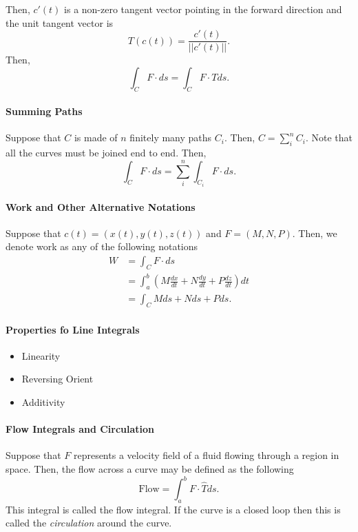 \documentclass[12pt, letterpaper]{article}
\begin{document}
    Then, \(c'(t)\) is a non-zero tangent vector pointing in the forward direction and the unit tangent vector is 
    \[T(c(t)) = \frac{c'(t)}{||c'(t)||}.\]
    Then,
    \[
        \int_C F\cdot ds = \int_C F \cdot T ds.
    \]
    
    \paragraph{Summing Paths}
    Suppose that \(C\) is made of \(n\) finitely many paths \(C_i\).
    Then, \(C = \sum_{i}^n C_i\).
    Note that all the curves must be joined end to end.
    Then,
    \[\int_C F \cdot ds = \sum_{i}^n \int_{C_i} F \cdot ds.\]

    \paragraph{Work and Other Alternative Notations}
    Suppose that \(c(t) = (x(t), y(t), z(t))\) and
    \(F = (M, N, P)\).
    Then, we denote work as any of the following notations
    \begin{align*}
        W
        &= \int_C F\cdot ds \\
        &= \int_a^b \left(
            M \frac{dx}{dt} + N \frac{dy}{dt} + P \frac{dz}{dt}
        \right) dt \\
        &= \int_C M ds + N ds + P ds.
    \end{align*}
    
    \paragraph{Properties fo Line Integrals}
    \begin{itemize}
        \item Linearity
        \item Reversing Orient
    \item Additivity
    \end{itemize}

    \paragraph{Flow Integrals and Circulation}
    Suppose that \(F\) represents a velocity field of a fluid flowing
    through a region in space. Then, the flow across a curve may be
    defined as the following
    \[
    \text{Flow} = \int_a^b F\cdot \hat{T}ds.
    \]
    This integral is called the flow integral. If the curve is a closed
    loop then this is called the \textit{circulation} around the curve.
\end{document}
